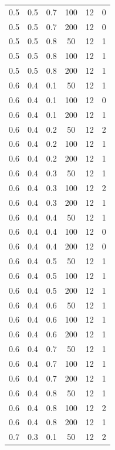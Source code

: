 \documentclass[a4paper,14pt, unknownkeysallowed]{extreport}
\begin{document}
\begin{center}
\begin{longtable}[c]{|c|c|c|c|c|c|}
	0.5 &  0.5 &  0.7 &  100 &    12 &     0 \\
	0.5 &  0.5 &  0.7 &  200 &    12 &     0 \\
   \hline
	0.5 &  0.5 &  0.8 &   50 &    12 &     1 \\
	0.5 &  0.5 &  0.8 &  100 &    12 &     1 \\
	0.5 &  0.5 &  0.8 &  200 &    12 &     1 \\
   \hline
	0.6 &  0.4 &  0.1 &   50 &    12 &     1 \\
	0.6 &  0.4 &  0.1 &  100 &    12 &     0 \\
	0.6 &  0.4 &  0.1 &  200 &    12 &     1 \\
   \hline
	0.6 &  0.4 &  0.2 &   50 &    12 &     2 \\
	0.6 &  0.4 &  0.2 &  100 &    12 &     1 \\
	0.6 &  0.4 &  0.2 &  200 &    12 &     1 \\
   \hline
	0.6 &  0.4 &  0.3 &   50 &    12 &     1 \\
	0.6 &  0.4 &  0.3 &  100 &    12 &     2 \\
	0.6 &  0.4 &  0.3 &  200 &    12 &     1 \\
   \hline
	0.6 &  0.4 &  0.4 &   50 &    12 &     1 \\
	0.6 &  0.4 &  0.4 &  100 &    12 &     0 \\
	0.6 &  0.4 &  0.4 &  200 &    12 &     0 \\
   \hline
	0.6 &  0.4 &  0.5 &   50 &    12 &     1 \\
	0.6 &  0.4 &  0.5 &  100 &    12 &     1 \\
	0.6 &  0.4 &  0.5 &  200 &    12 &     1 \\
   \hline
	0.6 &  0.4 &  0.6 &   50 &    12 &     1 \\
	0.6 &  0.4 &  0.6 &  100 &    12 &     1 \\
	0.6 &  0.4 &  0.6 &  200 &    12 &     1 \\
   \hline
	0.6 &  0.4 &  0.7 &   50 &    12 &     1 \\
	0.6 &  0.4 &  0.7 &  100 &    12 &     1 \\
	0.6 &  0.4 &  0.7 &  200 &    12 &     1 \\
   \hline
	0.6 &  0.4 &  0.8 &   50 &    12 &     1 \\
	0.6 &  0.4 &  0.8 &  100 &    12 &     2 \\
	0.6 &  0.4 &  0.8 &  200 &    12 &     1 \\
   \hline
	0.7 &  0.3 &  0.1 &   50 &    12 &     2 \\

\end{longtable}
\end{center}
\end{document}
